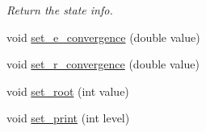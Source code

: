 \begin{DoxyCompactItemize}
\begin{DoxyCompactList}\small\item\em Return the state info. \end{DoxyCompactList}\item 
void \mbox{\hyperlink{classforte_1_1_active_space_method_ac4f39aa66c9d4481d172ea9e6255dc03}{set\+\_\+e\+\_\+convergence}} (double value)
\item 
void \mbox{\hyperlink{classforte_1_1_active_space_method_a59aad054d7966dc86ef01ea143fb1308}{set\+\_\+r\+\_\+convergence}} (double value)
\item 
void \mbox{\hyperlink{classforte_1_1_active_space_method_a0abdfc8523b4c7e4fdd3a0e6a3d4bd13}{set\+\_\+root}} (int value)
\item 
void \mbox{\hyperlink{classforte_1_1_active_space_method_a4442ac4afcec13630ff4e539a321205a}{set\+\_\+print}} (int level)
\end{DoxyCompactItemize}
